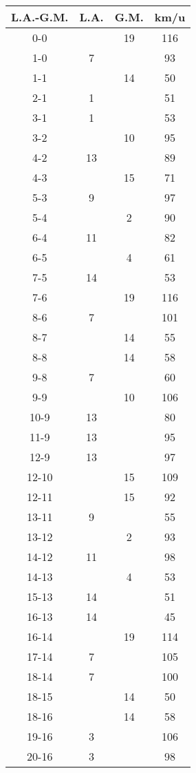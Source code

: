 \begin{table}[ht!]
  \centering
  \scriptsize
  \begin{tabular}{|c|c|c|c|} \hline
    L.A.-G.M. & L.A. & G.M. & km/u \\ \hline
    0-0 &  & 19 & 116 \\
    1-0 & 7 & & 93 \\
    1-1 &  & 14 & 50 \\
    2-1 & 1 & & 51 \\
    3-1 & 1 & & 53 \\
    3-2 &  & 10 & 95 \\
    4-2 & 13 & & 89 \\
    4-3 &  & 15 & 71 \\
    5-3 & 9 & & 97 \\
    5-4 &  & 2 & 90 \\
    6-4 & 11 & & 82 \\
    6-5 &  & 4 & 61 \\
    7-5 & 14 & & 53 \\
    7-6 &  & 19 & 116 \\
    8-6 & 7 &  & 101 \\
    8-7 &  & 14 & 55 \\
    8-8 &  & 14 & 58 \\
    9-8 & 7 & & 60 \\
    9-9 &  & 10 & 106 \\
    10-9 & 13 & & 80 \\
    11-9 & 13 & & 95 \\
    12-9 & 13 & & 97 \\
    12-10 &  & 15 & 109 \\
    12-11 &  & 15 & 92 \\
    13-11 & 9 &  & 55 \\
    13-12 &  & 2 & 93 \\
    14-12 & 11 &  & 98 \\
    14-13 &  & 4 & 53 \\
    15-13 & 14 &  & 51 \\
    16-13 & 14 &  & 45 \\
    16-14 &  & 19 & 114 \\
    17-14 & 7 &  & 105 \\
    18-14 & 7 &  & 100 \\
    18-15 &  & 14 & 50 \\
    18-16 &  & 14 & 58 \\
    19-16 & 3 &  & 106 \\
    20-16 & 3 &  & 98 \\

\end{tabular}
\end{table}
